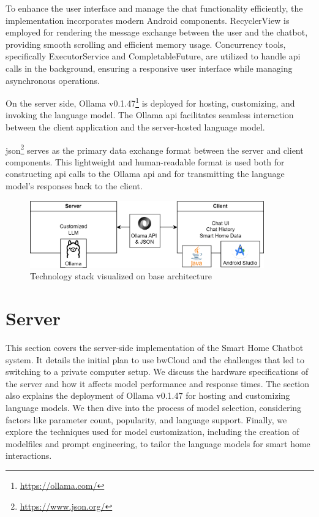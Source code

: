 To enhance the user interface and manage the chat functionality efficiently, the implementation incorporates modern Android components. RecyclerView is employed for rendering the message exchange between the user and the chatbot, providing smooth scrolling and efficient memory usage. Concurrency tools, specifically ExecutorService and CompletableFuture, are utilized to handle \gls{api} calls in the background, ensuring a responsive user interface while managing asynchronous operations.

On the server side, Ollama v0.1.47\footnote{\url{https://ollama.com/}} is deployed for hosting, customizing, and invoking the language model. The Ollama \gls{api} facilitates seamless interaction between the client application and the server-hosted language model.

\gls{json}\footnote{\url{https://www.json.org/}} serves as the primary data exchange format between the server and client components. This lightweight and human-readable format is used both for constructing \gls{api} calls to the Ollama \gls{api} and for transmitting the language model's responses back to the client.
\begin{figure}[h]
    \centering
    \captionsetup{justification=centering}
    \includegraphics[width=0.9\textwidth]{graphics/techstack.png}
    \caption{Technology stack visualized on base architecture}
    \label{fig:techstack}
\end{figure}

\section{Server}
This section covers the server-side implementation of the Smart Home Chatbot system. 
It details the initial plan to use bwCloud and the challenges that led to switching to a private computer setup. 
We discuss the hardware specifications of the server and how it affects model performance and response times. 
The section also explains the deployment of Ollama v0.1.47 for hosting and customizing language models. 
We then dive into the process of model selection, considering factors like parameter count, popularity, and language support. 
Finally, we explore the techniques used for model customization, including the creation of modelfiles and prompt engineering, to tailor the language models for smart home interactions.

